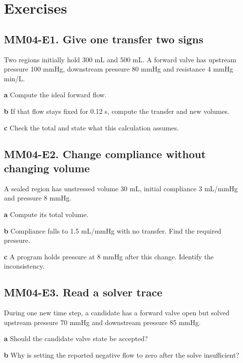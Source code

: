 \documentclass[11pt,letterpaper]{article}
\theoremstyle{definition}\newtheorem{definition}{Definition}\newtheorem{example}{Example}
\numberwithin{equation}{section}
\begin{document}
\section*{Exercises}
\par\noindent\begin{minipage}{\linewidth}
\subsection*{MM04-E1. Give one transfer two signs}
Two regions initially hold 300 mL and 500 mL. A forward valve has upstream pressure 100 mmHg, downstream pressure 80 mmHg and resistance 4 mmHg min/L.

\textbf{a} Compute the ideal forward flow.

\end{minipage}\par\medskip
\textbf{b} If that flow stays fixed for 0.12 s, compute the transfer and new volumes.

\textbf{c} Check the total and state what this calculation assumes.

\par\noindent\begin{minipage}{\linewidth}
\subsection*{MM04-E2. Change compliance without changing volume}
A sealed region has unstressed volume 30 mL, initial compliance 3 mL/mmHg and pressure 8 mmHg.

\textbf{a} Compute its total volume.

\end{minipage}\par\medskip
\textbf{b} Compliance falls to 1.5 mL/mmHg with no transfer. Find the required pressure.

\textbf{c} A program holds pressure at 8 mmHg after this change. Identify the inconsistency.

\par\noindent\begin{minipage}{\linewidth}
\subsection*{MM04-E3. Read a solver trace}
During one new time step, a candidate has a forward valve open but solved upstream pressure 70 mmHg and downstream pressure 85 mmHg.

\textbf{a} Should the candidate valve state be accepted?

\end{minipage}\par\medskip
\textbf{b} Why is setting the reported negative flow to zero after the solve insufficient?
\end{document}

